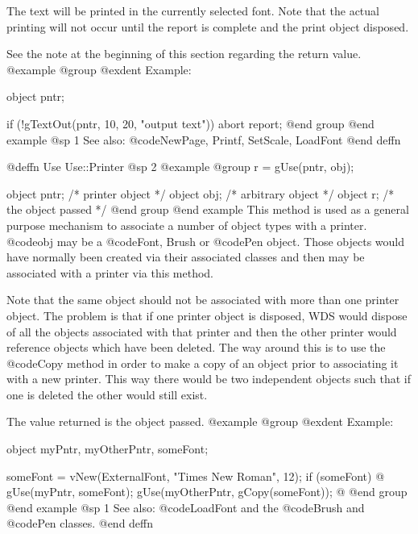 The text will be printed in the currently selected font.  Note that the
actual printing will not occur until the report is complete and the
print object disposed.

See the note at the beginning of this section regarding the return value.
@example
@group
@exdent Example:

object  pntr;

if (!gTextOut(pntr, 10, 20, "output text"))
        abort report;
@end group
@end example
@sp 1
See also:  @code{NewPage, Printf, SetScale, LoadFont}
@end deffn







@deffn {Use} Use::Printer
@sp 2
@example
@group
r = gUse(pntr, obj);

object  pntr;   /*  printer object     */
object  obj;    /*  arbitrary object   */
object  r;      /*  the object passed  */
@end group
@end example
This method is used as a general purpose mechanism to associate a
number of object types with a printer.  @code{obj} may be a @code{Font,
Brush} or @code{Pen} object.  Those objects would have normally been
created via their associated classes and then may be associated with a
printer via this method.

Note that the same object should not be associated with more than one
printer object.  The problem is that if one printer object is disposed, WDS
would dispose of all the objects associated with that printer and then the
other printer would reference objects which have been deleted.  The way
around this is to use the @code{Copy} method in order to make a copy of
an object prior to associating it with a new printer.  This way there would
be two independent objects such that if one is deleted the other would
still exist.

The value returned is the object passed.
@example
@group
@exdent Example:

object  myPntr, myOtherPntr, someFont;

someFont = vNew(ExternalFont, "Times New Roman", 12);
if (someFont)  @{
        gUse(myPntr, someFont);
        gUse(myOtherPntr, gCopy(someFont));
@}
@end group
@end example
@sp 1
See also:  @code{LoadFont} and the @code{Brush} and @code{Pen} classes.
@end deffn












